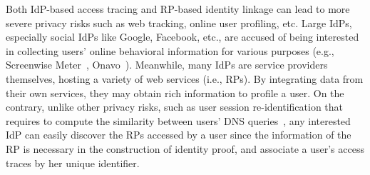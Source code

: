 

Both IdP-based access tracing and RP-based identity linkage can lead to more severe privacy risks such as web tracking, online user profiling, etc. Large IdPs, especially social IdPs like Google, Facebook, etc., are accused of being interested in collecting users' online behavioral information for various purposes (e.g., Screenwise Meter~\cite{googlenews}, Onavo~\cite{Onavo}). Meanwhile, many IdPs are service providers themselves, hosting a variety of web services (i.e., RPs). By integrating data from their own services, they may obtain rich information to profile a user. On the contrary, unlike other privacy risks, such as user session re-identification that requires to compute the similarity between users' DNS queries~\cite{DNS}, any interested IdP can easily discover the RPs accessed by a user since the information of the RP is necessary in  the construction of identity proof, and associate a user's access traces by her unique identifier.

